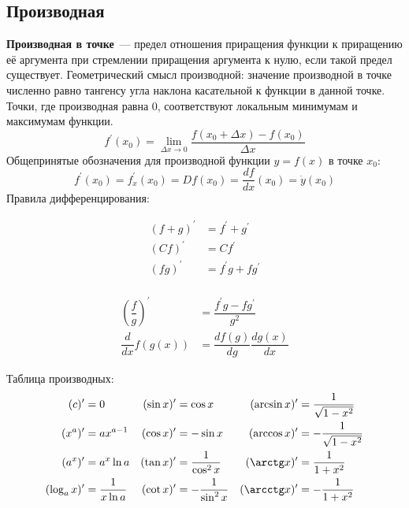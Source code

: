\subsection{Производная}
\textbf{Производная в точке}~--- предел отношения приращения функции к приращению её аргумента при стремлении приращения аргумента к нулю, если такой предел существует. Геометрический смысл производной: значение производной в точке численно равно тангенсу угла наклона касательной к функции в данной точке. Точки, где производная равна 0, соответствуют локальным минимумам и максимумам функции.
\begin{equation}
f^\prime(x_0) = \lim_{\Delta x \to 0}\frac{f(x_0 + \Delta x) - f(x_0)}{\Delta x}
\end{equation}
Общепринятые обозначения для производной функции $y = f(x)$ в точке $x_0$:
\begin{equation}
f^\prime(x_0) = f^\prime_x(x_0) = D f(x_0) = \frac{d f}{d x}(x_0) = \dot{y} (x_0)
\end{equation}
Правила дифференцирования:\\
\begin{minipage}{0.5\textwidth}
\begin{align*}
(f+g)^\prime &= f^\prime + g^\prime\\
(Cf)^\prime &= Cf^\prime\\
(fg)^\prime &= f^\prime g + f g^\prime\\
\end{align*}
\end{minipage}
\begin{minipage}{0.5\textwidth}
\begin{align*}
\left(\dfrac{f}{g}\right)^\prime &= \dfrac{f^\prime g - f g^\prime}{g^2}\\
\dfrac{d}{dx}f(g(x)) &= \dfrac{df(g)}{dg}\dfrac{dg(x)}{dx}
\end{align*}
\end{minipage}
Таблица производных:
\begin{align*}
(c)^\prime &= 0 & (\sin x)^\prime &= \cos x & (\arcsin x)^\prime &= \dfrac{1}{\sqrt{1 - x^2}} \\
(x^a)^\prime &= a x^{a-1} & (\cos x)^\prime &= - \sin x & (\arccos x)^\prime &= - \dfrac{1}{\sqrt{1 - x^2}} \\
(a^x)^\prime &= a^x \ln a & (\tan x)^\prime &= \dfrac{1}{\cos^2 x} & (\arctg x)^\prime &= \dfrac{1}{1 + x^2} \\
(\log_a x)^\prime &= \dfrac{1}{x \ln a} & (\cot x)^\prime &= - \dfrac{1}{\sin^2 x} & (\arcctg x)^\prime &= - \dfrac{1}{1 + x^2} 
\end{align*}

